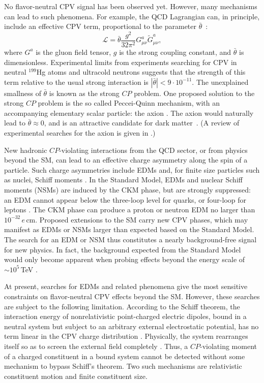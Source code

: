 No flavor-neutral CPV signal has been observed yet. However, many mechanisms can lead to such phenomena. For example, the QCD Lagrangian can, in principle, include an effective CPV term, proportional to the parameter $\bar{\theta}$~\cite{pospelov1999theta}:
\begin{equation}
	\mathcal{L} = \bar{\theta}\frac{g^2}{32\pi^2}G^a_{\mu\nu}\widetilde{G}^a_{\mu\nu},
\end{equation}
where $G^a$ is the gluon field tensor, $g$ is the strong coupling constant, and $\bar{\theta}$ is dimensionless. Experimental limits from experiments searching for CPV in neutral $^{199}$Hg atoms \cite{graner2016reduced} and ultracold neutrons \cite{baker2006improved, abel2020measurement} suggests that the strength of this term relative to the usual strong interaction is $\left|\bar{\theta}\right|<9\cdot10^{-11}$. The unexplained smallness of $\bar{\theta}$ is known as the strong $CP$ problem. One proposed solution to the strong $CP$ problem is the so called Peccei-Quinn mechanism, with an accompanying elementary scalar particle: the axion \cite{PhysRevLett.38.1440}. The axion would naturally lead to $\bar{\theta}\approx 0$, and is an attractive candidate for dark matter~\cite{PRESKILL1983127,PhysRevLett.50.925,PhysRevLett.124.101303}. (A review of experimental searches for the axion is given in \cite{graham2015experimental}.)

New hadronic $CP$-violating interactions from the QCD sector, or from physics beyond the SM, can lead to an effective charge asymmetry along the spin of a particle. Such charge asymmetries include EDMs and, for finite size particles such as nuclei, Schiff moments \cite{schiff1963measurability}. In the Standard Model, EDMs and nuclear Schiff moments (NSMs) are induced by the CKM phase, but are strongly suppressed: an EDM cannot appear below the three-loop level for quarks, or four-loop for leptons \cite{pospelov1991electric}. The CKM phase can produce a proton or neutron EDM no larger than $10^{-32}\,e\,$cm. Proposed extensions to the SM carry new CPV phases, which may manifest as EDMs or NSMs larger than expected based on the Standard Model. The search for an EDM or NSM thus constitutes a nearly background-free signal for new physics. In fact, the background expected from the Standard Model would only become apparent when probing effects beyond the energy scale of $\sim\!10^{5}\,$TeV \cite{pospelov2005electric}.

At present, searches for EDMs and related phenomena give the most sensitive constraints on flavor-neutral CPV effects beyond the SM. However, these searches are subject to the following limitation. According to the Schiff theorem, the interaction energy of nonrelativistic point-charged electric dipoles, bound in a neutral system but subject to an arbitrary external electrostatic potential, has no term linear in the CPV charge distribution \cite{schiff1963measurability}. Physically, the system rearranges itself so as to screen the external field completely \cite{safronova2018search}. Thus, a $CP$-violating moment of a charged constituent in a bound system cannot be detected without some mechanism to bypass Schiff's theorem. Two such mechanisms are relativistic constituent motion and finite constituent size. 

